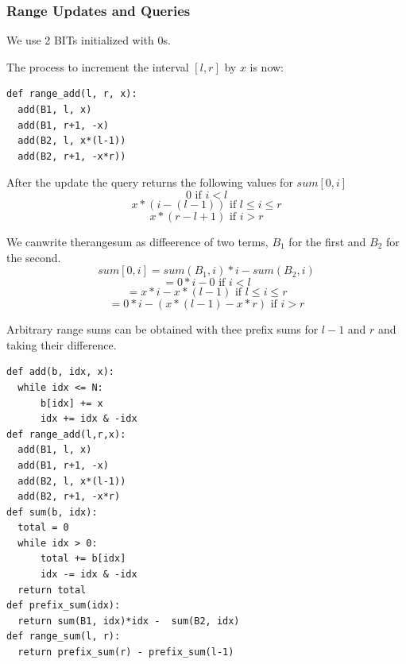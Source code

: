 \documentclass{IEEEtran}
\begin{document}
      \subsubsection{Range Updates and Queries}
        We use 2 BITs initialized with 0s.\par
        The process to increment the interval $[l,r]$ by $x$ is now:
        \begin{lstlisting}
def range_add(l, r, x):
  add(B1, l, x)
  add(B1, r+1, -x)
  add(B2, l, x*(l-1))
  add(B2, r+1, -x*r))
        \end{lstlisting}
        \par After the update the query returns the following values for $sum[0,i]$
        $$0\text{ if $i<l$}$$
        $$x*(i-(l-1))\text{ if $l\leq i\leq r$}$$
        $$x*(r-l+1)\text{ if $i > r$}$$
        \par We canwrite therangesum as diffeerence of two terms, $B_1$ for the first and $B_2$ for the second.
        $$sum[0,i]=sum(B_1,i)*i-sum(B_2,i)$$
        $$=0*i-0\text{ if $i<l$}$$
        $$=x*i-x*(l-1)\text{ if $l\leq i\leq r$}$$
        $$=0*i-(x*(l-1)-x*r)\text{ if $i > r$}$$
        \par Arbitrary range sums can be obtained with thee prefix sums for $l-1$ and $r$ and taking their difference.
        \begin{lstlisting}
def add(b, idx, x):
  while idx <= N:
      b[idx] += x
      idx += idx & -idx
def range_add(l,r,x):
  add(B1, l, x)
  add(B1, r+1, -x)
  add(B2, l, x*(l-1))
  add(B2, r+1, -x*r)
def sum(b, idx):
  total = 0
  while idx > 0:
      total += b[idx]
      idx -= idx & -idx
  return total
def prefix_sum(idx):
  return sum(B1, idx)*idx -  sum(B2, idx)
def range_sum(l, r):
  return prefix_sum(r) - prefix_sum(l-1)
        \end{lstlisting}
\end{document}
